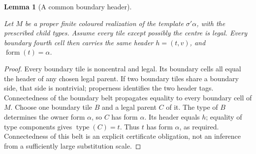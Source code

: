 \documentclass[11pt,a4paper]{article}
\newtheorem{lemma}[definition]{Lemma}
\theoremstyle{remark}
\newcommand{\lean}[1]{}
\newcommand{\uses}[1]{}
\begin{document}
\begin{lemma}[A common boundary header]
\label{lem:comp/boundary-header}
\lean{Tilings.Planned.boundary_header_constant,Tilings.Planned.Strict.strict_boundary_header_constant}
\uses{def:certificate,lem:comp/legal-properties,def:control/header}
Let $M$ be a proper finite coloured realization of the template $\sigma'\alpha$,
with the prescribed child types. Assume every tile except possibly the
centre is legal. Every boundary fourth cell then carries the same header
$h=(t,v)$, and $\operatorname{form}(t)=\alpha$.
\end{lemma}
\begin{proof}
Every boundary tile is noncentral and legal. Its boundary cells all equal
the header of any chosen legal parent. If two boundary tiles share a boundary
side, that side is nontrivial; properness identifies the two header tags.
Connectedness of the boundary belt propagates equality to every boundary
cell of $M$. Choose one boundary tile $B$ and a legal parent $C$ of it.
The type of $B$ determines the owner form $\alpha$, so $C$ has form $\alpha$.
Its header equals $h$; equality of type components gives $\operatorname{type}(C)=t$.
Thus $t$ has form $\alpha$, as required. Connectedness of this belt is an
explicit certificate obligation, not an inference from a sufficiently
large substitution scale.
\end{proof}
\end{document}
